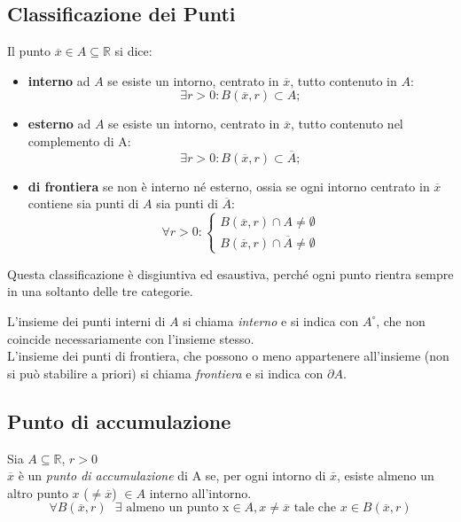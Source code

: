 \documentclass[a4paper,12pt, oneside]{book}
\begin{document}
\subsection{Classificazione dei Punti}
Il punto $\overline{x}\in A \subseteq \mathbb{R}$ si dice:
\begin{itemize}
	\item \textbf{interno} ad $A$ se esiste un intorno, centrato in $\overline{x}$, tutto contenuto in $A$: $$\exists r>0\colon B(\overline{x},r)\subset A;$$
	\item \textbf{esterno} ad $A$ se esiste un intorno, centrato in $\overline{x}$, tutto contenuto nel complemento di A: $$\exists r>0\colon B(\overline{x},r)\subset\overline{A};$$
	\item \textbf{di frontiera} se non è interno né esterno, ossia se ogni intorno centrato in $\overline{x}$ contiene sia punti di $A$ sia punti di $\overline{A}$:
	      $$\forall r>0:\left\{
		      \begin{array}{ll}
			      B(\overline{x},r)\cap A\neq\emptyset \\
			      B(\overline{x},r)\cap\overline{A}\neq\emptyset
		      \end{array}
		      \right.$$
\end{itemize}
\begin{osservazione}
	Questa classificazione è disgiuntiva ed esaustiva, perché ogni punto rientra sempre in una soltanto delle tre categorie.
\end{osservazione}
\begin{shaded}
	L'insieme dei punti interni di $A$ si chiama \emph{interno} e si indica con ${A}^{\circ}$, che non coincide necessariamente con l'insieme stesso.\\

	L'insieme dei punti di frontiera, che possono o meno appartenere all'insieme (non si può stabilire a priori) si chiama \emph{frontiera} e si indica con $\partial A$.
\end{shaded}
\subsection{Punto di accumulazione}
\begin{definizione}
	Sia $A \subseteq \mathbb{R}$, $r>0$\\
	$\overline{x}$ è un \emph{punto di accumulazione} di A se, per ogni intorno di $\overline{x}$, esiste almeno un altro punto $x$ ($ \neq \overline{x}$) $\in A$ interno all'intorno.
	\begin{equation}
		\forall B(\overline{x},r) \mbox{  } \exists \mbox{ almeno un punto x} \in A, x \neq \overline{x} \mbox{ tale che } x \in B(\overline{x},r)
	\end{equation}
\end{definizione}
\end{document}
